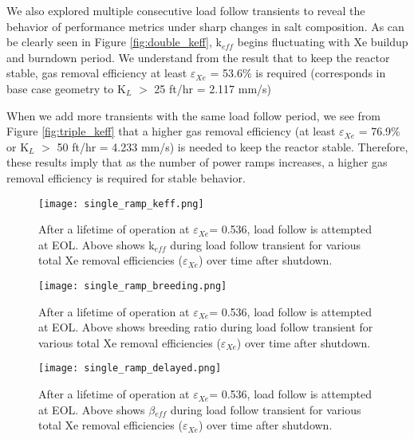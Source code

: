     We also explored multiple consecutive load follow transients to reveal the
    behavior of performance metrics under sharp changes in salt composition. As
    can be clearly seen in Figure \ref{fig:double_keff}, k$_{eff}$ begins
    fluctuating with Xe buildup and burndown period. We understand from the
    result that to keep the reactor stable, gas removal efficiency at least
    $\varepsilon$$_{Xe}$ = 53.6\% is required (corresponds in base case geometry
    to K$_{L}$ $>$ 25 ft/hr = 2.117 mm/s)

    When we add more transients with the same load follow period, we see from
    Figure \ref{fig:triple_keff} that a higher gas removal efficiency (at least
    $\varepsilon$$_{Xe}$ = 76.9\% or K$_{L}$ $>$ 50 ft/hr = 4.233 mm/s) is
    needed to keep the reactor stable. Therefore, these results imply that as
    the number of power ramps increases, a higher gas removal efficiency is
    required for stable behavior.

    \begin{figure}[htbp!]
        \begin{center}
            \texttt{[image: single\_ramp\_keff.png]}
        \end{center}
        \caption{After a lifetime of operation at $\varepsilon$$_{Xe}$= 0.536, load follow is attempted at EOL. Above shows k$_{eff}$ during load follow transient for various total Xe removal efficiencies
        ($\varepsilon$$_{Xe}$) over time after shutdown.}
        \label{fig:single_keff}
    \end{figure}

    \begin{figure}[htbp!]
        \begin{center}
            \texttt{[image: single\_ramp\_breeding.png]}
        \end{center}
        \caption{After a lifetime of operation at $\varepsilon$$_{Xe}$= 0.536, load follow is attempted at EOL. Above shows breeding ratio during load
        follow transient for various total Xe removal efficiencies
        ($\varepsilon$$_{Xe}$) over time after shutdown.}
        \label{fig:single_breed}
    \end{figure}

    \begin{figure}[htbp!]
        \begin{center}
            \texttt{[image: single\_ramp\_delayed.png]}
        \end{center}
        \caption{After a lifetime of operation at $\varepsilon$$_{Xe}$= 0.536, load follow is attempted at EOL. Above shows $\beta$$_{eff}$ during load
        follow transient for various total Xe removal efficiencies
        ($\varepsilon$$_{Xe}$) over time after shutdown.}
        \label{fig:single_delayed}
    \end{figure}

